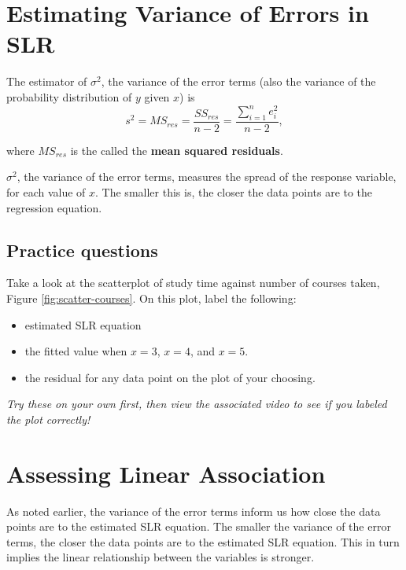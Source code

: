 \documentclass[
]{book}
\providecommand{\tightlist}{%
  \setlength{\itemsep}{0pt}\setlength{\parskip}{0pt}}
\begin{document}
\section{Estimating Variance of Errors in SLR}\label{estimating-variance-of-errors-in-slr}

The estimator of \(\sigma^2\), the variance of the error terms (also the variance of the probability distribution of \(y\) given \(x\)) is
\begin{equation} 
s^2 = MS_{res} = \frac{SS_{res}}{n-2} = \frac{\sum\limits_{i=1}^n e_i^2}{n-2},
\label{eq:variance}
\end{equation}

where \(MS_{res}\) is the called the \textbf{mean squared residuals}.

\(\sigma^2\), the variance of the error terms, measures the spread of the response variable, for each value of \(x\). The smaller this is, the closer the data points are to the regression equation.

\subsection{Practice questions}\label{practice-questions-1}

Take a look at the scatterplot of study time against number of courses taken, Figure \ref{fig:scatter-courses}. On this plot, label the following:

\begin{itemize}
\tightlist
\item
  estimated SLR equation
\item
  the fitted value when \(x=3\), \(x=4\), and \(x=5\).
\item
  the residual for any data point on the plot of your choosing.
\end{itemize}

\emph{Try these on your own first, then view the associated video to see if you labeled the plot correctly!}

\section{Assessing Linear Association}\label{assessing-linear-association}

As noted earlier, the variance of the error terms inform us how close the data points are to the estimated SLR equation. The smaller the variance of the error terms, the closer the data points are to the estimated SLR equation. This in turn implies the linear relationship between the variables is stronger.
\end{document}
